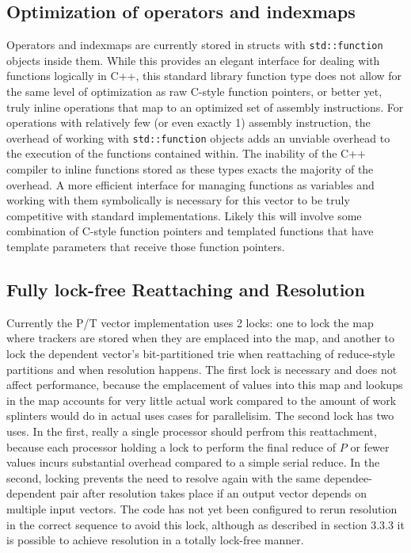 \subsection{Optimization of operators and indexmaps}
Operators and indexmaps are currently stored in structs with
\texttt{std::function} objects inside them. While this provides an elegant
interface for dealing with functions logically in C++, this standard library
function type does not allow for the same level of optimization as raw C-style
function pointers, or better yet, truly inline operations that map to an
optimized set of assembly instructions. For operations with relatively few (or
even exactly 1) assembly instruction, the overhead of working with
\texttt{std::function} objects adds an unviable overhead to the execution of the
functions contained within. The inability of the C++ compiler to inline
functions stored as these types exacts the majority of the overhead. A more
efficient interface for managing functions as variables and working with them
symbolically is necessary for this vector to be truly competitive with standard
implementations. Likely this will involve some combination of C-style function
pointers and templated functions that have template parameters that receive
those function pointers.

\subsection{Fully lock-free Reattaching and Resolution}
Currently the P/T vector implementation uses 2 locks: one to lock the map where
trackers are stored when they are emplaced into the map, and another to lock the
dependent vector's bit-partitioned trie when reattaching of reduce-style
partitions and when resolution happens. The first lock is necessary and does not
affect performance, because the emplacement of values into this map
and lookups in the map accounts for very little actual work compared to the
amount of work splinters would do in actual uses cases for parallelisim. The
second lock has two uses. In the first, really a single processor should perfrom
this reattachment, because each processor holding a lock to perform the final
reduce of $P$ or fewer values incurs substantial overhead compared to a simple
serial reduce. In the second, locking prevents the need to resolve again with
the same dependee-dependent pair after resolution takes place if an output
vector depends on multiple input vectors.  The code has not yet been configured
to rerun resolution in the correct sequence to avoid this lock, although as
described in section 3.3.3 it is possible to achieve resolution in a totally
lock-free manner.


